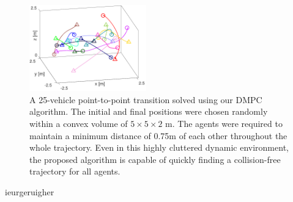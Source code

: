 \begin{figure}[t]
	\centering
	\includegraphics[width=0.45\textwidth]{figures/30_rand}
	\caption{A 25-vehicle point-to-point transition solved using our DMPC algorithm. The initial and final positions were chosen randomly within a convex volume of $5 \times 5 \times 2$ m. The agents were required to maintain a minimum distance of 0.75m of each other throughout the whole trajectory. Even in this highly cluttered dynamic environment, the proposed algorithm is capable of quickly finding a collision-free trajectory for all agents.}
	\label{fig:30_random}
\end{figure}

ieurgeruigher





